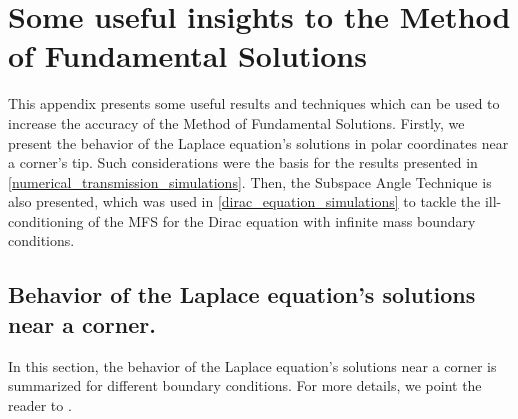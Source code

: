\chapter{Some useful insights to the Method of Fundamental Solutions}
\label{chapter:appendixB}

This appendix presents some useful results and techniques which can be used to increase the accuracy of the Method of Fundamental Solutions. Firstly, we present the behavior of the Laplace equation's solutions in polar coordinates near a corner's tip. Such considerations were the basis for the results presented in \ref{numerical_transmission_simulations}. Then, the Subspace Angle Technique is also presented, which was used in \ref{dirac_equation_simulations} to tackle the ill-conditioning of the \ac{MFS} for the Dirac equation with infinite mass boundary conditions.

\section{Behavior of the Laplace equation's solutions near a corner.}\label{appendixB_corners}


In this section, the behavior of the Laplace equation's solutions near a corner is summarized for different boundary conditions. For more details, we point the reader to \cite{li2000singularities}.

